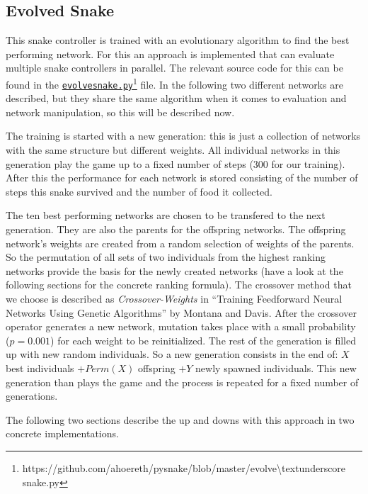 \documentclass[a4paper]{article}
\def\repository{https://github.com/ahoereth/pysnake}
\def\repositoryurl#1{\repository/blob/master/#1}
\def\coderef#1{\href{\repositoryurl{#1}}{\texttt{#1}\footnote{\url{\repositoryurl{#1}}}}}
\begin{document}
\subsection{Evolved Snake}
This snake controller is trained with an evolutionary algorithm to find the best performing network. For this an approach is implemented that can evaluate multiple snake controllers in parallel. The relevant source code for this can be found in the \coderef{evolve\textunderscore snake.py} file. In the following two different networks are described, but they share the same algorithm when it comes to evaluation and network manipulation, so this will be described now.

The training is started with a new generation: this is just a collection of networks with the same structure but different weights. All individual networks in this generation play the game up to a fixed number of steps ($300$ for our training). After this the performance for each network is stored consisting of the number of steps this snake survived and the number of food it collected.

The ten best performing networks are chosen to be transfered to the next generation. They are also the parents for the offspring networks. The offspring network's weights are created from a random selection of weights of the parents. So the permutation of all sets of two individuals from the highest ranking networks provide the basis for the newly created networks (have a look at the following sections for the concrete ranking formula). The crossover method that we choose is described as \textit{Crossover-Weights} in ``Training Feedforward Neural Networks Using Genetic Algorithms'' by Montana and Davis\cite{montanaTrain}. After the crossover operator generates a new network, mutation takes place with a small probability ($p = 0.001$) for each weight to be reinitialized. The rest of the generation is filled up with new random individuals. So a new generation consists in the end of: $X$ best individuals $+ Perm(X)$ offspring $+ Y$ newly spawned individuals. This new generation than plays the game and the process is repeated for a fixed number of generations.

The following two sections describe the up and downs with this approach in two concrete implementations.
\end{document}
